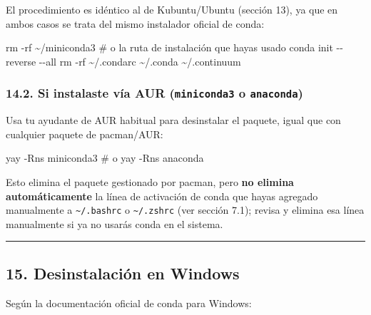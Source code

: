 \documentclass[
  doc,
  floatsintext,
  longtable,
  a4paper,
  nolmodern,
  notxfonts,
  notimes,
  12pt,
  colorlinks=true,linkcolor=blue,citecolor=blue,urlcolor=blue]{apa7}
\newenvironment{Shaded}{\begin{snugshade}}{\end{snugshade}}
\newcommand{\AttributeTok}[1]{\textcolor[rgb]{0.40,0.45,0.13}{#1}}
\newcommand{\CommentTok}[1]{\textcolor[rgb]{0.37,0.37,0.37}{#1}}
\newcommand{\ExtensionTok}[1]{\textcolor[rgb]{0.00,0.23,0.31}{#1}}
\newcommand{\FunctionTok}[1]{\textcolor[rgb]{0.28,0.35,0.67}{#1}}
\newcommand{\NormalTok}[1]{\textcolor[rgb]{0.00,0.23,0.31}{#1}}
\begin{document}
El procedimiento es idéntico al de Kubuntu/Ubuntu (sección 13), ya que
en ambos casos se trata del mismo instalador oficial de conda:

\begin{Shaded}
\begin{Highlighting}[]
\FunctionTok{rm} \AttributeTok{{-}rf}\NormalTok{ \textasciitilde{}/miniconda3   }\CommentTok{\# o la ruta de instalación que hayas usado}
\ExtensionTok{conda}\NormalTok{ init }\AttributeTok{{-}{-}reverse} \AttributeTok{{-}{-}all}
\FunctionTok{rm} \AttributeTok{{-}rf}\NormalTok{ \textasciitilde{}/.condarc \textasciitilde{}/.conda \textasciitilde{}/.continuum}
\end{Highlighting}
\end{Shaded}

\subsubsection{\texorpdfstring{14.2. Si instalaste vía AUR
(\texttt{miniconda3} o
\texttt{anaconda})}{14.2. Si instalaste vía AUR (miniconda3 o anaconda)}}\label{si-instalaste-vuxeda-aur-miniconda3-o-anaconda}

Usa tu ayudante de AUR habitual para desinstalar el paquete, igual que
con cualquier paquete de pacman/AUR:

\begin{Shaded}
\begin{Highlighting}[]
\ExtensionTok{yay} \AttributeTok{{-}Rns}\NormalTok{ miniconda3}
\CommentTok{\# o}
\ExtensionTok{yay} \AttributeTok{{-}Rns}\NormalTok{ anaconda}
\end{Highlighting}
\end{Shaded}

Esto elimina el paquete gestionado por pacman, pero \textbf{no elimina
automáticamente} la línea de activación de conda que hayas agregado
manualmente a \texttt{\textasciitilde{}/.bashrc} o
\texttt{\textasciitilde{}/.zshrc} (ver sección 7.1); revisa y elimina
esa línea manualmente si ya no usarás conda en el sistema.

\begin{center}\rule{0.5\linewidth}{0.5pt}\end{center}

\subsection{15. Desinstalación en
Windows}\label{desinstalaciuxf3n-en-windows}

Según la documentación oficial de conda para Windows:
\end{document}
